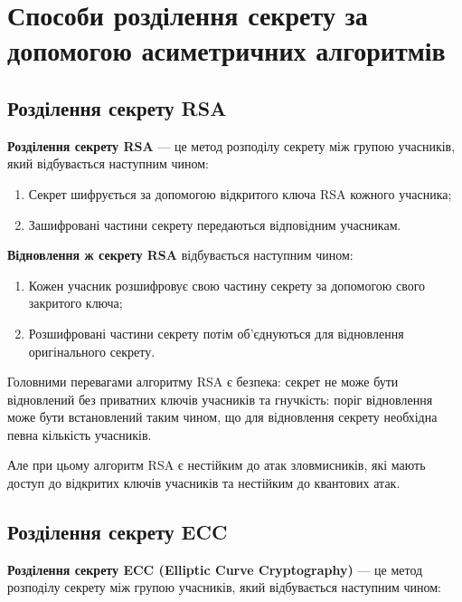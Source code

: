\chapter{Способи розділення секрету за допомогою асиметричних алгоритмів}
\label{chap:review3}  %

\section{Розділення секрету RSA}

\textbf{Розділення секрету RSA} --- це метод розподілу секрету між групою учасників, який відбувається наступним чином:

\begin{enumerate}
    \item Секрет шифрується за допомогою відкритого ключа RSA кожного учасника;
    \item Зашифровані частини секрету передаються відповідним учасникам.
\end{enumerate}

\vspace{0.5cm}
\textbf{Відновлення ж секрету RSA} відбувається наступним чином:

\begin{enumerate}
    \item Кожен учасник розшифровує свою частину секрету за допомогою свого закритого ключа;
    \item Розшифровані частини секрету потім об’єднуються для відновлення оригінального секрету.
\end{enumerate}

\vspace{0.5cm}
Головними перевагами алгоритму RSA є безпека: секрет не може бути відновлений без приватних ключів учасників та гнучкість: поріг відновлення може бути встановлений таким чином, що для відновлення секрету необхідна певна кількість учасників.

Але при цьому алгоритм RSA є нестійким до атак зловмисників, які мають доступ до відкритих ключів учасників та нестійким до квантових атак.

\section{Розділення секрету ECC}

\textbf{Розділення секрету ECC (Elliptic Curve Cryptography)} --- це метод розподілу секрету між групою учасників, який відбувається наступним чином:

